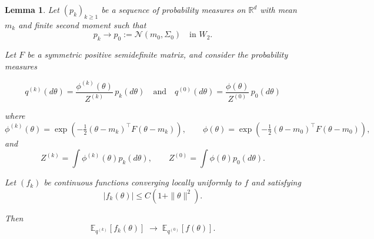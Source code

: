 \documentclass[a4paper,11pt]{article}
\newtheorem{lemma}{Lemma}
\begin{document}
\begin{lemma} \label{lmm:weak_conv_qk}
Let $(p_k)_{k\ge1}$ be a sequence of probability measures on $\mathbb{R}^d$  with mean $m_k$ and finite second moment such that
\[
p_k \to p_0 := \mathcal N(m_0,\Sigma_0)
\quad\text{in } W_2.
\]

Let $F$ be a symmetric positive semidefinite matrix, and consider the probability measures 

\[
q^{(k)}(d\theta)
=
\frac{\phi^{(k)}(\theta)}{Z^{(k)}}\,p_k(d\theta)\quad\text{and}\quad
q^{(0)}(d\theta)
=
\frac{\phi(\theta)}{Z^{(0)}}\,p_0(d\theta)
\]


where
\[
\phi^{(k)}(\theta)
=
\exp\!\left(-\tfrac12(\theta-m_k)^\top F (\theta-m_k)\right),
\qquad
\phi(\theta)
=
\exp\!\left(-\tfrac12(\theta-m_0)^\top F (\theta-m_0)\right),
\]
and
\[
Z^{(k)}=\int \phi^{(k)}(\theta)p_k(d\theta),
\qquad
Z^{(0)}=\int \phi(\theta)p_0(d\theta).
\]

Let $(f_k)$ be continuous functions converging locally uniformly to $f$ and satisfying
\[
|f_k(\theta)| \le C(1+\|\theta\|^2).
\]

Then
\[
\mathbb{E}_{q^{(k)}}[f_k(\theta)]
\;\longrightarrow\;
\mathbb{E}_{q^{(0)}}[f(\theta)] .
\]
\end{lemma}
\end{document}

